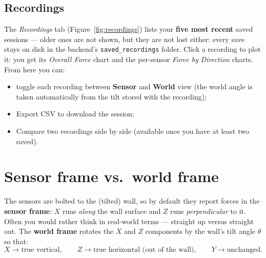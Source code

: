 \documentclass[11pt,a4paper]{article}
\begin{document}

\subsection{Recordings}
The \emph{Recordings} tab (Figure~\ref{fig:recordings}) lists your \textbf{five
most recent} saved sessions --- older ones are not shown, but they are not lost
either: every save stays on disk in the backend's \texttt{saved\_recordings}
folder. Click a recording to plot it: you get its \emph{Overall Force} chart and
the per-sensor \emph{Force by Direction} charts. From here you can:
\begin{itemize}[leftmargin=1.4em]
  \item toggle each recording between \textbf{Sensor} and \textbf{World} view (the
        world angle is taken automatically from the tilt stored with the
        recording);
  \item \textsf{Export CSV} to download the session;
  \item \textsf{Compare} two recordings side by side (available once you have at
        least two saved).
\end{itemize}


\section{Sensor frame vs.\ world frame}
\label{sec:world}

The sensors are bolted to the (tilted) wall, so by default they report forces in
the \textbf{sensor frame}: $X$ runs \emph{along} the wall surface and $Z$ runs
\emph{perpendicular} to it. Often you would rather think in real-world terms ---
straight up versus straight out. The \textbf{world frame} rotates the $X$ and $Z$
components by the wall's tilt angle $\theta$ so that:
\[
  X \rightarrow \text{true vertical}, \qquad Z \rightarrow \text{true horizontal
  (out of the wall)}, \qquad Y \rightarrow \text{unchanged}.
\]
\end{document}
